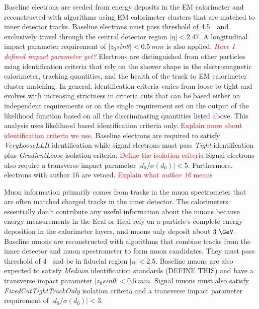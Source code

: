 Baseline electrons are seeded from energy deposits in the EM calorimeter and reconstructed with algorithms using EM calorimeter clusters that are matched to inner detector tracks.  Baseline electrons must pass \pt{} threshold of 4.5~\GeV~and exclusively travel through the central detector region $|\eta | < 2.47$.  A longitudinal impact parameter requirement of $|z_0sin\theta| < 0.5~mm$ is also applied. \textcolor{red}{\textit{Have I defined impact parameter yet?}} Electrons are distinguished from other particles using identification criteria that rely on the shower shape in the electromagnetic calorimeter, tracking quantities, and the health of the track to EM calorimeter cluster matching.  In general, identification criteria varies from loose to tight and evolves with increasing strictness in criteria cuts that can be based either on independent requirements or on the single requirement set on the output of the likelihood function based on all the discriminating quantities listed above.  This analysis uses likelihood based identification criteria only.  \textcolor{red}{Explain more about identification criteria we use.}  Baseline electrons are required to satisfy \textit{VeryLooseLLH} identification while signal electrons must pass \textit{Tight} identification plus \textit{GradientLoose} isolation criteria. \textcolor{red}{Define the isolation criteria}  Signal electrons also require a transverse impact parameter $|d_0/\sigma(d_0)| < 5$. Furthermore, electrons with author 16 are vetoed.  \textcolor{red}{Explain what \textit{author 16} means}

Muon information primarily comes from tracks in the muon spectrometer that are often matched charged tracks in the inner detector.  The calorimeters essentially don't contribute any useful information about the muons because energy measurements in the Ecal or Hcal rely on a particle's complete energy deposition in the calorimeter layers, and muons only deposit about $3~\GeV$.   Baseline muons are reconstructed with algorithms that combine tracks from the inner detector and muon spectrometer to form muon candidates.  They must pass \pt{} threshold of 4 ~\GeV and be in fiducial region $|\eta | < 2.5$. Baseline muons are also expected to satisfy \textit{Medium} identification standards (DEFINE THIS) and have a transverse impact parameter $|z_0sin\theta| < 0.5~mm$.  Signal muons must also satisfy \textit{FixedCutTightTrackOnly} isolation criteria and a transverse impact parameter requirement of $|d_0/\sigma(d_0)| < 3$.

